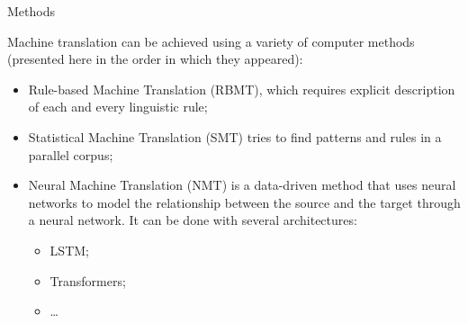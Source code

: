 \documentclass[aspectratio=169]{beamer}
\begin{document}

    \begin{frame}{Methods}
    
        Machine translation can be achieved using a variety of computer methods (presented here in the order in which they appeared):
        
        \begin{itemize}
            \item Rule-based Machine Translation (RBMT), which requires explicit description of each and every linguistic rule;
            \item Statistical Machine Translation (SMT) tries to find patterns and rules in a parallel corpus;
            \item Neural Machine Translation (NMT) is a data-driven method that uses neural networks to model the relationship between the source and the target through a neural network. It can be done with several architectures:
                \begin{itemize}
                    \item LSTM;
                    \item Transformers;
                    \item …
                \end{itemize}
        \end{itemize}
        
    \end{frame}

\end{document}
